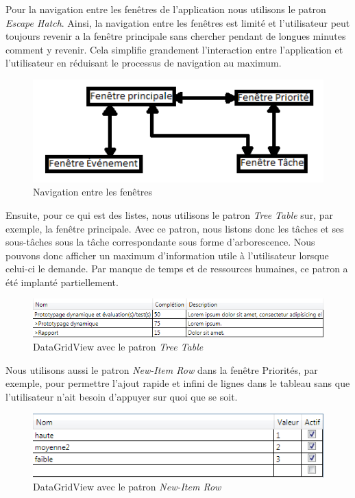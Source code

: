 \documentclass[letterpaper, oneside, 12pt, these, creativecommons]{thETS}
\begin{document}
Pour la navigation entre les fenêtres de l'application nous utilisons le patron \emph{Escape Hatch}. Ainsi, la navigation entre les fenêtres est limité et l'utilisateur peut toujours revenir a la fenêtre principale sans chercher pendant de longues minutes comment y revenir. Cela simplifie grandement l'interaction entre l'application et l'utilisateur en réduisant le processus de navigation au maximum.

\begin{figure}[H!]
	\centering
	\includegraphics[width=1\textwidth]{navigation.png}
	\caption{Navigation entre les fenêtres}
\end{figure}

\newpage

Ensuite, pour ce qui est des listes, nous utilisons le patron \emph{Tree Table} sur, par exemple, la fenêtre principale. Avec ce patron, nous listons donc les tâches et ses sous-tâches sous la tâche correspondante sous forme d'arborescence. Nous pouvons donc afficher un maximum d'information utile à l'utilisateur lorsque celui-ci le demande. Par manque de temps et de ressources humaines, ce patron a été implanté partiellement.

\begin{figure}[H!]
	\centering
	\includegraphics[width=1\textwidth]{tree_table.png}
	\caption{DataGridView avec le patron \emph{Tree Table}}
\end{figure}

Nous utilisons aussi le patron \emph{New-Item Row} dans la fenêtre Priorités, par exemple, pour permettre l'ajout rapide et infini de lignes dans le tableau sans que l'utilisateur n'ait besoin d'appuyer sur quoi que se soit. 

\begin{figure}[H!]
	\centering
	\includegraphics[width=1\textwidth]{new_item_row.png}
	\caption{DataGridView avec le patron \emph{New-Item Row}}
\end{figure}
\end{document}
